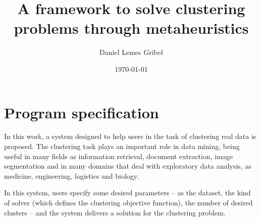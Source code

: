 \documentclass[10pt]{article}
\title{\textbf{A framework to solve clustering problems through metaheuristics}}
\author{Daniel Lemes Gribel}
\date{\today}
\begin{document}
\maketitle






\section{Program specification}
In this work, a system designed to help users in the task of clustering real data is proposed. The clustering task plays an important role in data mining, being useful in many fields as information retrieval, document extraction, image segmentation and in many domains that deal with exploratory data analysis, as medicine, engineering, logistics and biology.

In this system, users specify some desired parameters -- as the dataset, the kind of solver (which defines the clustering objective function), the number of desired clusters -- and the system delivers a solution for the clustering problem.
\end{document}
